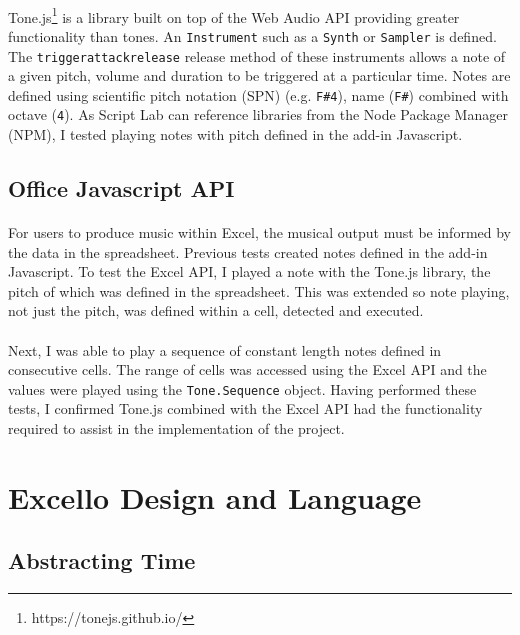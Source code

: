 \paragraph{} Tone.js\footnote{https://tonejs.github.io/} is a library built on top of the Web Audio API providing greater functionality than tones. An \texttt{Instrument} such as a \texttt{Synth} or \texttt{Sampler} is defined. The \texttt{triggerattackrelease} release method of these instruments allows a note of a given pitch, volume and duration to be triggered at a particular time. Notes are defined using scientific pitch notation (SPN) (e.g. \texttt{F\#4}), name (\texttt{F\#}) combined with octave (\texttt{4}). As Script Lab can reference libraries from the Node Package Manager (NPM), I tested playing notes with pitch defined in the add-in Javascript.

\subsection{Office Javascript API}

\paragraph{} For users to produce music within Excel, the musical output must be informed by the data in the spreadsheet. Previous tests created notes defined in the add-in Javascript. To test the Excel API, I played a note with the Tone.js library, the pitch of which was defined in the spreadsheet. This was extended so note playing, not just the pitch, was defined within a cell, detected and executed.

\paragraph{} Next, I was able to play a sequence of constant length notes defined in consecutive cells. The range of cells was accessed using the Excel API and the values were played using the \texttt{Tone.Sequence} object. Having performed these tests, I confirmed Tone.js combined with the Excel API had the functionality required to assist in the implementation of the project.

\section{Excello Design and Language}

\subsection{Abstracting Time}

